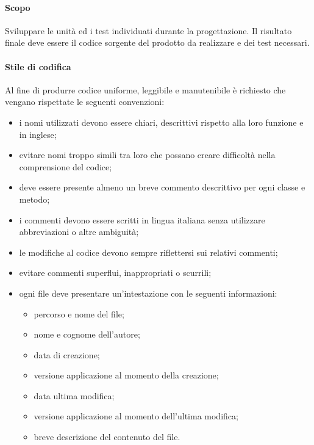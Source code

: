                 \paragraph{Scopo}
                Sviluppare le unità ed i test individuati durante la progettazione. Il risultato finale deve essere il codice sorgente del prodotto da realizzare e dei test necessari.
                
                \paragraph{Stile di codifica} \label{codeStyle}
                Al fine di produrre codice uniforme, leggibile e manutenibile è richiesto che vengano rispettate le seguenti convenzioni:
                \begin{itemize}
                    \item i nomi utilizzati devono essere chiari, descrittivi rispetto alla loro funzione e in inglese;
                    \item evitare nomi troppo simili tra loro che possano creare difficoltà nella comprensione del codice;
                    \item deve essere presente almeno un breve commento descrittivo per ogni classe e metodo;
                    \item i commenti devono essere scritti in lingua italiana senza utilizzare abbreviazioni o altre ambiguità;
                    \item le modifiche al codice devono sempre riflettersi sui relativi commenti;
                    \item evitare commenti superflui, inappropriati o scurrili;
                    \item ogni file deve presentare un'intestazione con le seguenti informazioni:
                        \begin{itemize}
                            \item percorso e nome del file;
                            \item nome e cognome dell'autore;
                            \item data di creazione;
							\item versione applicazione al momento della creazione;
							\item data ultima modifica;
							\item versione applicazione al momento dell'ultima modifica;
                            \item breve descrizione del contenuto del file.
                        \end{itemize}
                \end{itemize}

